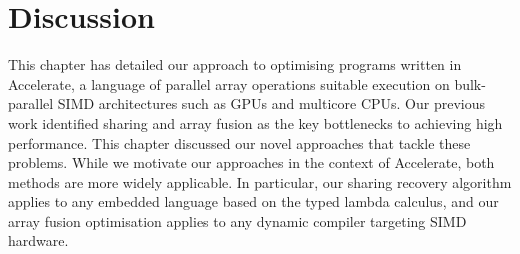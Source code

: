 %
%
%
%
%
%


\section{Discussion}

This chapter has detailed our approach to optimising programs written in
Accelerate, a language of parallel array operations suitable execution on
bulk-parallel SIMD architectures such as GPUs and multicore CPUs. Our previous
work identified sharing and array fusion as the key bottlenecks to achieving
high performance. This chapter discussed our novel approaches that tackle these
problems. While we motivate our approaches in the context of Accelerate, both
methods are more widely applicable. In particular, our sharing recovery
algorithm applies to any embedded language based on the typed lambda calculus,
and our array fusion optimisation applies to any dynamic compiler targeting
SIMD hardware.

